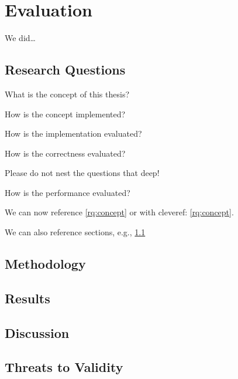 \setchaptertoc
\chapter{Evaluation}\label{chp:evaluation}

\begin{summary}
We did\ldots
\end{summary}

\section[RQs]{Research Questions}\label{sec:evaluation:rqs}

\begin{rqs}
    \item \label{rq:concept} What is the concept of this thesis?
    \item \label{rq:implementation} How is the concept implemented?
    \item \label{rq:evaluation} How is the implementation evaluated?
    \begin{rqs}
        \item \label{rq:evaluation:correctness} How is the correctness evaluated? \begin{rqs}
                                                                                      \item Please do not nest the questions that deep!
        \end{rqs}
        \item \label{rq:evaluation:performance} How is the performance evaluated?
    \end{rqs}
\end{rqs}

We can now reference \ref{rq:concept} or with cleveref: \cref{rq:concept}.

We can also reference sections, e.g., \cref{sec:evaluation:rqs}

\section{Methodology}

\section{Results}

\section{Discussion}

\section[Threats]{Threats to Validity}